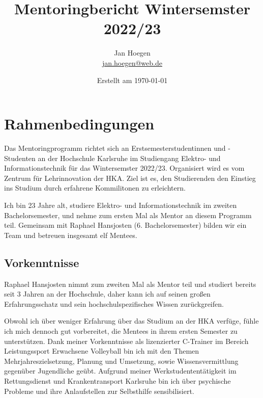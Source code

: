 \documentclass[
    paper=A4,
    div=calc,
    numbers=noendperiod
]{scrartcl}
\title{Mentoringbericht Wintersemster 2022/23}
\author{Jan Hoegen\\\href{mailto:jan.hoegen@web.de}{jan.hoegen@web.de}}
\date{Erstellt am \today}
\begin{document}
\maketitle


\section{Rahmenbedingungen}
    Das Mentoringprogramm richtet sich an Erstsemesterstudentinnen und -Studenten an der Hochschule Karlsruhe im Studiengang Elektro- und Informationstechnik für das Wintersemster 2022/23. Organisiert wird es vom Zentrum für Lehrinnovation der HKA. Ziel ist es, den Studierenden den Einstieg ins Studium durch erfahrene Kommilitonen zu erleichtern.

    Ich bin 23 Jahre alt, studiere Elektro- und Informationstechnik im zweiten Bachelorsemester, und nehme zum ersten Mal als Mentor an diesem Programm teil. Gemeinsam mit Raphael Hansjosten (6. Bachelorsemester) bilden wir ein Team und betreuen insgesamt elf Mentees. 

    \subsection*{Vorkenntnisse}
        Raphael Hansjosten nimmt zum zweiten Mal als Mentor teil und studiert bereits seit 3 Jahren an der Hochschule, daher kann ich auf seinen großen Erfahrungsschatz und sein hochschulspezifisches Wissen zurückgreifen. 

        Obwohl ich über weniger Erfahrung über das Studium an der HKA verfüge, fühle ich mich dennoch gut vorbereitet, die Mentees in ihrem ersten Semester zu unterstützen. Dank meiner Vorkenntnisse als lizenzierter C-Trainer im Bereich Leistungssport Erwachsene Volleyball bin ich mit den Themen Mehrjahreszielsetzung, Planung und Umsetzung, sowie Wissensvermittlung gegenüber Jugendliche geübt.  
        Aufgrund meiner Werkstudententätigkeit im Rettungsdienst und Krankentransport Karlsruhe bin ich über psychische Probleme und ihre Anlaufstellen zur Selbsthilfe sensibilisiert.  
        
 
\end{document}
